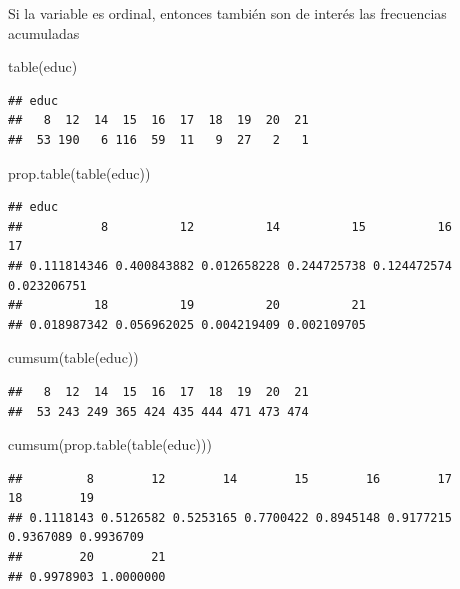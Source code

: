 \documentclass[
]{book}
\newenvironment{Shaded}{\begin{snugshade}}{\end{snugshade}}
\newcommand{\FunctionTok}[1]{\textcolor[rgb]{0.00,0.00,0.00}{#1}}
\newcommand{\NormalTok}[1]{#1}
\theoremstyle{break}
\begin{document}
Si la variable es ordinal, entonces también son de interés las
frecuencias acumuladas

\begin{Shaded}
\begin{Highlighting}[]
\FunctionTok{table}\NormalTok{(educ)}
\end{Highlighting}
\end{Shaded}

\begin{verbatim}
## educ
##   8  12  14  15  16  17  18  19  20  21 
##  53 190   6 116  59  11   9  27   2   1
\end{verbatim}

\begin{Shaded}
\begin{Highlighting}[]
\FunctionTok{prop.table}\NormalTok{(}\FunctionTok{table}\NormalTok{(educ))}
\end{Highlighting}
\end{Shaded}

\begin{verbatim}
## educ
##           8          12          14          15          16          17 
## 0.111814346 0.400843882 0.012658228 0.244725738 0.124472574 0.023206751 
##          18          19          20          21 
## 0.018987342 0.056962025 0.004219409 0.002109705
\end{verbatim}

\begin{Shaded}
\begin{Highlighting}[]
\FunctionTok{cumsum}\NormalTok{(}\FunctionTok{table}\NormalTok{(educ))}
\end{Highlighting}
\end{Shaded}

\begin{verbatim}
##   8  12  14  15  16  17  18  19  20  21 
##  53 243 249 365 424 435 444 471 473 474
\end{verbatim}

\begin{Shaded}
\begin{Highlighting}[]
\FunctionTok{cumsum}\NormalTok{(}\FunctionTok{prop.table}\NormalTok{(}\FunctionTok{table}\NormalTok{(educ)))}
\end{Highlighting}
\end{Shaded}

\begin{verbatim}
##         8        12        14        15        16        17        18        19 
## 0.1118143 0.5126582 0.5253165 0.7700422 0.8945148 0.9177215 0.9367089 0.9936709 
##        20        21 
## 0.9978903 1.0000000
\end{verbatim}
\end{document}
